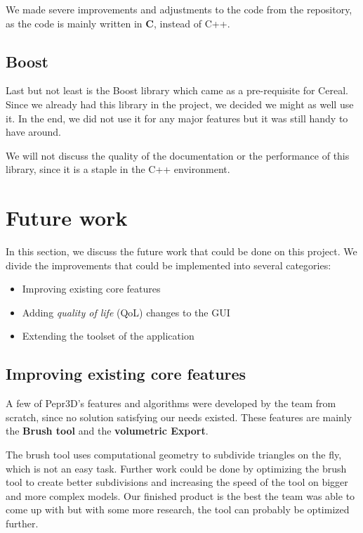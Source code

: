 We made severe improvements and adjustments to the code from the repository, as the code is mainly written in \textbf{C}, instead of C++.

\subsection{Boost}

Last but not least is the Boost library which came as a pre-requisite for Cereal. Since we already had this library in the project, we decided we might as well use it. In the end, we did not use it for any major features but it was still handy to have around.

We will not discuss the quality of the documentation or the performance of this library, since it is a staple in the C++ environment.

\section{Future work}

In this section, we discuss the future work that could be done on this project. We divide the improvements that could be implemented into several categories:

\begin{itemize}
\item Improving existing core features
\item Adding \textit{quality of life} (QoL) changes to the GUI
\item Extending the toolset of the application
\end{itemize}

\subsection{Improving existing core features}

A few of Pepr3D's features and algorithms were developed by the team from scratch, since no solution satisfying our needs existed. These features are mainly the \textbf{Brush tool} and the \textbf{volumetric Export}. 

The brush tool uses computational geometry to subdivide triangles on the fly, which is not an easy task. Further work could be done by optimizing the brush tool to create better subdivisions and increasing the speed of the tool on bigger and more complex models. Our finished product is the best the team was able to come up with but with some more research, the tool can probably be optimized further.

